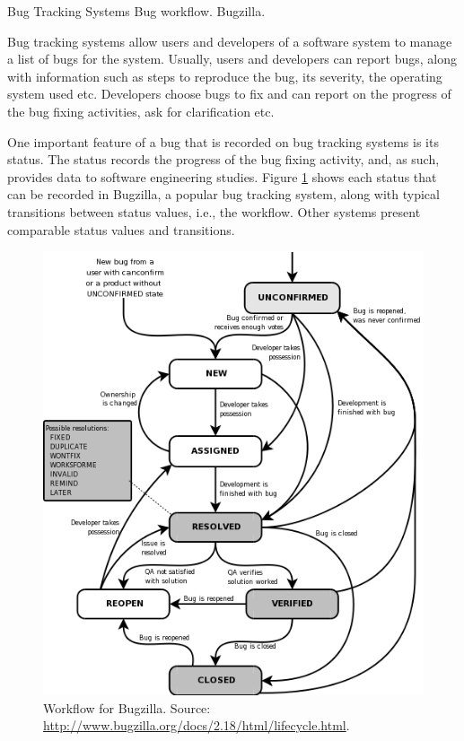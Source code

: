   \begin{subsection}{Bug Tracking Systems}
Bug workflow. Bugzilla. \cite{Bird2009}


Bug tracking systems allow users and developers of a software system to manage a list of bugs for the system. Usually, users and developers can report bugs, along with information such as steps to reproduce the bug, its severity, the operating system used etc. Developers choose bugs to fix and can report on the progress of the bug fixing activities, ask for clarification etc.

One important feature of a bug that is recorded on bug tracking systems is its status. The status records the progress of the bug fixing activity, and, as such, provides data to software engineering studies. Figure \ref{fig:bugzilla} shows each status that can be recorded in Bugzilla, a popular bug tracking system, along with typical transitions between status values, i.e., the workflow. Other systems present comparable status values and transitions.

\begin{figure}[ht]
	\centering
		\includegraphics[scale=0.4]{bugzilla.png}
	\caption{Workflow for Bugzilla. Source: \url{http://www.bugzilla.org/docs/2.18/html/lifecycle.html}.}
	\label{fig:bugzilla}
\end{figure}


\end{subsection}
